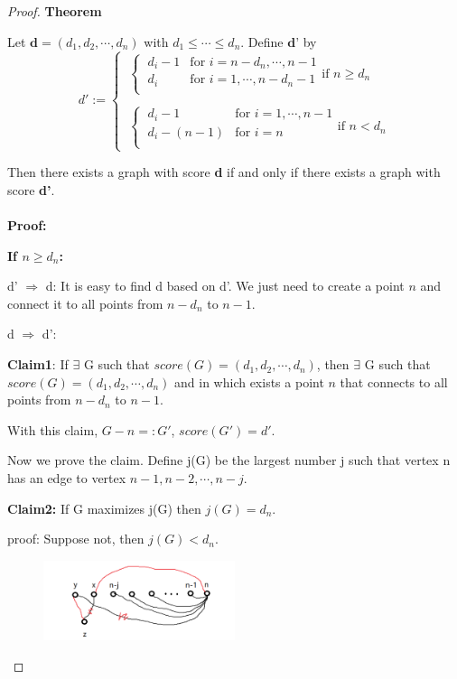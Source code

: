 \documentclass[12pt,a4]{article}
\begin{document}
\begin{proof}

  \textbf{Theorem}

  Let $\textbf{d}=(d_1,d_2,\cdots,d_n)$ with $d_1 \leq \cdots \leq d_n$. Define $\textbf{d'}$ by
  \begin{equation*}
  d':=
  \begin{cases}
    \
  \begin{cases}
  \ d_i-1 & \text{for } i=n-d_n,\cdots,n-1 \\
  \ d_i & \text{for } i=1,\cdots,n-d_n-1 \\
  \end{cases}
  \text{if } n \geq d_n \\
  \\
  \
  \begin{cases}
  \ d_i-1 & \text{for } i=1,\cdots,n-1 \\
  \ d_i-(n-1) & \text{for } i=n \\
  \end{cases}
  \text{if } n<d_n
\end{cases}
  \end{equation*}

Then there exists a graph with score \textbf{d} if and only if there exists a graph with score \textbf{d'}.
\\
\\
\textbf{Proof:}

\textbf{If $n \geq d_n$:}

d' $\Rightarrow$ d:
It is easy to find d based on d'. We just need to create a point $n$ and connect it to all points from $n-d_n$ to $n-1$.

d $\Rightarrow$ d':

\textbf{Claim1}:
If $\exists$ G such that $score(G)=(d_1,d_2,\cdots,d_n)$, then $\exists$ G such that $score(G)=(d_1,d_2,\cdots,d_n)$ and in which exists a point $n$ that connects to all points from $n-d_n$ to $n-1$.

With this claim, $G-n=:G'$, $score(G')=d'$.

Now we prove the claim. Define j(G) be the largest number j such that vertex n has an edge to vertex $n-1,n-2,\cdots,n-j$.

\textbf{Claim2:}
If G maximizes j(G) then $j(G)=d_n$.

proof: Suppose not, then $j(G)<d_n$.
\begin{figure}[!htb]
    \centering
    \includegraphics[width=0.5\textwidth]{2.jpg}
\end{figure}


\end{proof}
\end{document}
